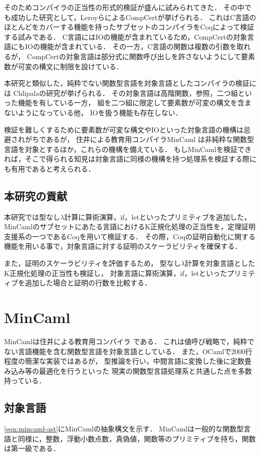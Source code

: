 \documentclass{sumiilab-paper}
\begin{document}
そのためコンパイラの正当性の形式的検証が盛んに試みられてきた．
その中でも成功した研究として，LeroyらによるCompCert\cite{2006-Leroy-Blazy-Dargaye}が挙げられる．
これはC言語のほとんどをカバーする機能を持ったサブセットのコンパイラをCoqによって検証する試みである．
C言語にはIOの機能が含まれているため，CompCertの対象言語にもIOの機能が含まれている．
その一方，C言語の関数は複数の引数を取れるが，
CompCertの対象言語は部分式に関数呼び出しを許さないようにして要素数が可変の構文に制限を設けている．

本研究と類似した，純粋でない関数型言語を対象言語としたコンパイラの検証には
Chlipalaの研究\cite{ImpurePOPL10}が挙げられる．
その対象言語は高階関数，参照，二つ組といった機能を有している一方，
組を二つ組に限定して要素数が可変の構文を含まないようになっている他，
IOを扱う機能も存在しない．

検証を難しくするために要素数が可変な構文やIOといった対象言語の機構は忌避されがちであるが，
住井による教育用コンパイラMinCaml\cite{DBLP:conf/icfp/Sumii05} \cite{MinCaml110006664764}は非純粋な関数型言語を対象とするほか，これらの機構を備えている．
もしMinCamlを検証できれば，そこで得られる知見は対象言語に同様の機構を持つ処理系を検証する際にも有用であると考えられる．

\section{本研究の貢献}
本研究では型なし$\lambda$計算に算術演算，if，letといったプリミティブを追加した，
MinCamlのサブセットにあたる言語におけるK正規化処理の正当性を，定理証明支援系の一つであるCoqを用いて検証する．
その際，Coqの証明自動化に関する機能を用いる事で，対象言語に対する証明のスケーラビリティを確保する．

また，証明のスケーラビリティを評価するため，
型なし$\lambda$計算を対象言語としたK正規化処理の正当性も検証し，
対象言語に算術演算，if，letといったプリミティブを追加した場合と証明の行数を比較する．

\chapter{MinCaml}
MinCamlは住井による教育用コンパイラ\cite{DBLP:conf/icfp/Sumii05} \cite{MinCaml110006664764}である．
これは値呼び戦略で，純粋でない言語機能を含む関数型言語を対象言語としている．
また，OCamlで2000行程度の簡潔な実装ではあるが，
型推論を行い，中間言語に変換した後に定数畳み込み等の最適化を行うといった
現実の関数型言語処理系と共通した点を多数持っている．

\section{対象言語}
\figurename\ref{eqn:mincaml-ast}にMinCamlの抽象構文を示す．
MinCamlは一般的な関数型言語と同様に，整数，浮動小数点数，真偽値，関数等のプリミティブを持ち，関数は第一級である．
\end{document}
